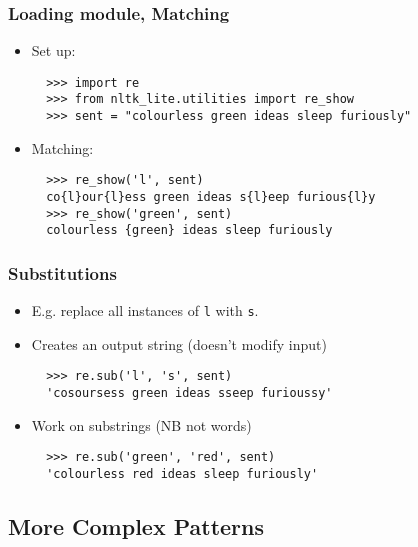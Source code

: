 \documentclass{beamer}             %
\begin{document}
\begin{frame}[fragile]
\frametitle{Loading module, Matching}

\begin{itemize}
\item Set up:

\begin{verbatim}
  >>> import re
  >>> from nltk_lite.utilities import re_show
  >>> sent = "colourless green ideas sleep furiously"
\end{verbatim}

\item Matching:

\begin{verbatim}
  >>> re_show('l', sent)
  co{l}our{l}ess green ideas s{l}eep furious{l}y
  >>> re_show('green', sent)
  colourless {green} ideas sleep furiously
\end{verbatim}
\end{itemize}
\end{frame}

\begin{frame}[fragile]
\frametitle{Substitutions}

\begin{itemize}
\item E.g. replace all instances of \texttt{l} with \texttt{s}.
\item Creates an output string (doesn't modify input)

\begin{verbatim}
  >>> re.sub('l', 's', sent)
  'cosoursess green ideas sseep furioussy'
\end{verbatim}

\item Work on substrings (NB not words)

\begin{verbatim}
  >>> re.sub('green', 'red', sent)
  'colourless red ideas sleep furiously'
\end{verbatim}
\end{itemize}
\end{frame}

\subsection{More Complex Patterns}
\end{document}
